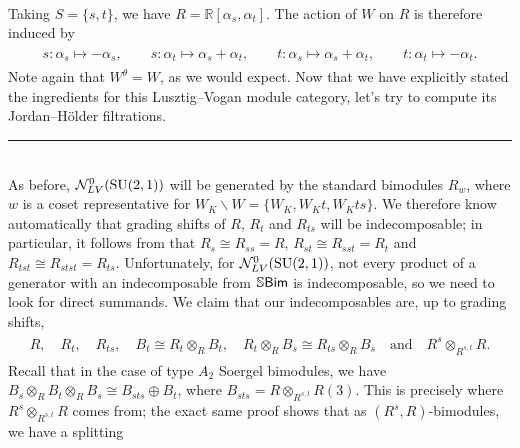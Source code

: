\begin{example}
\begin{align*}
\begin{split}
\end{split}
\end{align*}
\noindent Taking $S = \{s, t\}$, we have $R = \mathbb{R}[\alpha_s, \alpha_t]$. The action of $W$ on $R$ is therefore induced by
\begin{align*}
\begin{split}
s : \alpha_s \mapsto -\alpha_s,\qquad s : \alpha_t \mapsto \alpha_s + \alpha_t,\qquad t : \alpha_s \mapsto \alpha_s + \alpha_t,\qquad t : \alpha_t \mapsto -\alpha_t.
\end{split}
\end{align*}
\noindent Note again that $W^\theta = W$, as we would expect. Now that we have explicitly stated the ingredients for this Lusztig--Vogan module category, let's try to compute its Jordan--H\"{o}lder filtrations.\\[-1.5\baselineskip]
\begin{center}
\rule{0.5\linewidth}{1pt}
\end{center}
\noindent\\[-\baselineskip]
\noindent As before, $\mathcal{N}_{LV}^0(\textup{SU}(2, 1))$ will be generated by the standard bimodules $R_w$, where $w$ is a coset representative for $W_K\backslash W = \{W_K, W_Kt, W_Kts\}$. We therefore know automatically that grading shifts of $R$, $R_t$ and $R_{ts}$ will be indecomposable; in particular, it follows from \cite[Lemma 6.2.3]{LR22} that $R_s \cong R_{ss} = R$, $R_{st} \cong R_{sst} = R_t$ and $R_{tst} \cong R_{stst} = R_{ts}$. Unfortunately, for $\mathcal{N}_{LV}^0(\textup{SU}(2, 1))$, not every product of a generator with an indecomposable from $\mathbb{S}\textup{\textsf{Bim}}$ is indecomposable, so we need to look for direct summands. We claim that our indecomposables are, up to grading shifts,
\begin{align*}
\begin{split}
R,\quad R_t,\quad R_{ts},\quad B_t \cong R_t \otimes_R B_t,\quad R_t \otimes_R B_s \cong R_{ts} \otimes_R B_s\quad\text{and}\quad R^s \otimes_{R^{s,t}} R.
\end{split}
\end{align*}
\noindent Recall that in the case of type $A_2$ Soergel bimodules, we have $B_s \otimes_R B_t \otimes_R B_s \cong B_{sts} \oplus B_t$, where $B_{sts} = R \otimes_{R^{s,t}} R(3)$. This is precisely where $R^s \otimes_{R^{s,t}} R$ comes from; the exact same proof shows that as $(R^s, R)$-bimodules, we have a splitting

\end{example}
